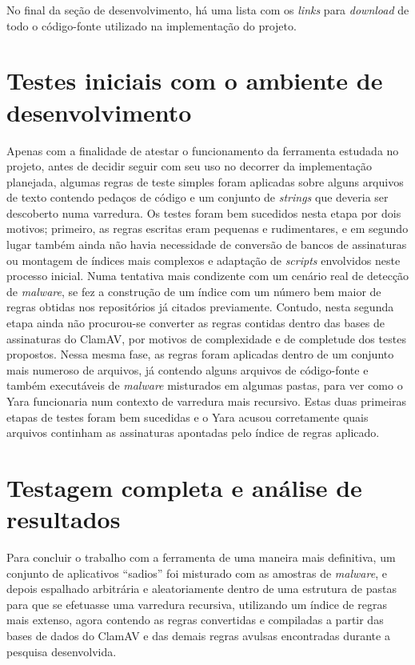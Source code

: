 No final da seção de desenvolvimento, há uma lista com os \textit{links} para
\textit{download} de todo o código-fonte utilizado na implementação do projeto.

\section{Testes iniciais com o ambiente de desenvolvimento}
\label{s.testesiniciais}

Apenas com a finalidade de atestar o funcionamento da ferramenta estudada no projeto,
antes de decidir seguir com seu uso no decorrer da implementação planejada,
algumas regras de teste simples foram aplicadas sobre alguns arquivos de texto
contendo pedaços de código e um conjunto de \textit{strings} que deveria ser
descoberto numa varredura. Os testes foram bem sucedidos nesta etapa por dois
motivos; primeiro, as regras escritas eram pequenas e rudimentares, e em segundo
lugar também ainda não havia necessidade de conversão de bancos de assinaturas
ou montagem de índices mais complexos e adaptação de \textit{scripts} envolvidos
neste processo inicial. Numa tentativa mais condizente com um cenário real de
detecção de \textit{malware},
se fez a construção de um índice com um número bem maior de regras obtidas nos repositórios
já citados previamente. Contudo, nesta segunda etapa ainda não procurou-se converter as
regras contidas dentro das bases de assinaturas do ClamAV, por motivos de complexidade
e de completude dos testes propostos. Nessa mesma fase, as regras foram aplicadas dentro
de um conjunto mais numeroso de arquivos, já contendo alguns arquivos de código-fonte
e também executáveis de \textit{malware} misturados em algumas pastas, para ver como
o Yara funcionaria num contexto de varredura mais recursivo. Estas duas primeiras etapas
de testes foram bem sucedidas e o Yara acusou corretamente quais arquivos continham
as assinaturas apontadas pelo índice de regras aplicado.



\section{Testagem completa e análise de resultados}
\label{s.testefull}

Para concluir o trabalho com a ferramenta de uma maneira mais definitiva, um
conjunto de aplicativos ``sadios'' foi misturado com as amostras de
\textit{malware}, e depois espalhado arbitrária e aleatoriamente dentro de uma
estrutura de pastas para que se efetuasse uma varredura recursiva, utilizando um
índice de regras mais extenso, agora contendo as regras convertidas e compiladas
a partir das bases de dados do ClamAV e das demais regras avulsas encontradas
durante a pesquisa desenvolvida.

